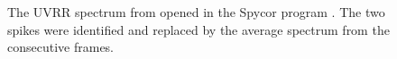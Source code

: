 \begin{figure}
	\centering
	\caption[%
		Spycor -- program for spike removal.
	]{%
		The UVRR spectrum from  opened in the
		Spycor program
		\parencite{Spycor2018}.
		The two spikes were identified and replaced by the average spectrum
		from the consecutive frames.
	}
	\label{\figlabel{cosmic_spikes:spycor}}
\end{figure}
